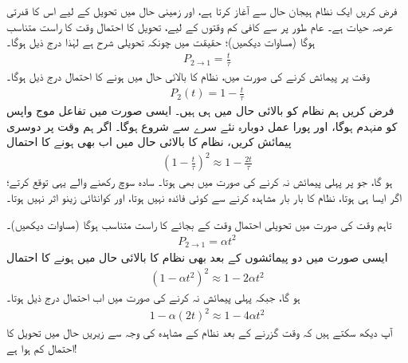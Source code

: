 فرض کریں ایک نظام ہیجان حال  سے آغاز کرتا ہے، اور زمینی حال  میں تحویل کے لیے اس کا قدرتی عرصہ حیات  ہے۔ عام طور پر  سے کافی کم وقتوں کے لیے، تحویل کا احتمال وقت  کا راست متناسب ہوگا (مساوات  دیکھیں)؛ حقیقت میں چونکہ تحویلی شرح  ہے لہٰذا درج ذیل ہوگا۔
\begin{align}
	P_{2\to1}=\frac{t}{\tau}
\end{align}
وقت  پر پیمائش کرنے کی صورت میں، نظام کا بالائی حال میں ہونے کا احتمال درج ذیل ہوگا۔
\begin{align}
	P_2(t)=1-\frac{t}{\tau}
\end{align}
فرض کریں ہم نظام کو بالائی حال میں ہی  ہیں۔ ایسی صورت میں تفاعل موج واپس  کو منہدم ہوگا، اور پورا عمل دوبارہ نئے سرے سے شروع ہوگا۔ اگر ہم وقت  پر دوسری پیمائش کریں، نظام کا بالائی حال میں اب بھی ہونے کا احتمال 
\begin{align}
	\left(1-\frac{t}{\tau}\right)^2\approx1-\frac{2t}{\tau}
\end{align}
ہو گا، جو  پر پہلی پیمائش نہ کرنے کی صورت میں بھی ہوتا۔ سادہ سوچ رکھنے والے یہی توقع کرتے؛ اگر ایسا ہی ہوتا، نظام کا بار بار مشاہدہ کرنے سے کوئی فائدہ نہیں ہوتا، اور کوانٹائی زینو اثر نہیں ہوتا۔

 تاہم  وقت کی صورت میں تحویلی احتمال وقت  کے بجائے  کا راست متناسب ہوگا (مساوات  دیکھیں)۔
\begin{align}
	P_{2\to1}=\alpha t^2
\end{align}
ایسی صورت میں دو پیمائشوں کے بعد بھی نظام کا بالائی حال میں ہونے کا احتمال
\begin{align}
	\left(1-\alpha t^2\right)^2\approx 1-2\alpha t^2
\end{align}
ہو گا، جبکہ پہلی پیمائش نہ کرنے کی صورت میں اب احتمال درج ذیل ہوتا۔
\begin{align}
	1-\alpha(2t)^2\approx1-4\alpha t^2
\end{align}
آپ دیکھ سکتے ہیں کہ وقت  گزرنے کے بعد نظام کے مشاہدہ کی وجہ سے  زیریں حال میں تحویل کا احتمال کم ہوا ہے!

